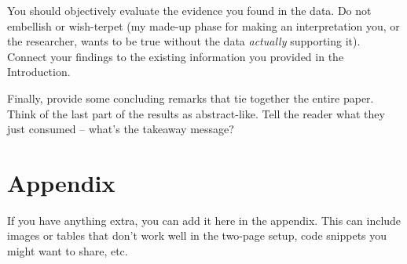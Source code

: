\documentclass{article}\usepackage[]{graphicx}\usepackage[]{xcolor}
\begin{document}
\begin{multicols}{2}
 You should objectively evaluate the evidence you found in the data. Do not embellish or wish-terpet (my made-up phase for making an interpretation you, or the researcher, wants to be true without the data \emph{actually} supporting it). Connect your findings to the existing information you provided in the Introduction.

Finally, provide some concluding remarks that tie together the entire paper. Think of the last part of the results as abstract-like. Tell the reader what they just consumed -- what's the takeaway message?

\vspace{2em}


\begin{tiny}

\end{tiny}
\end{multicols}

\newpage
\onecolumn
\section{Appendix}

If you have anything extra, you can add it here in the appendix. This can include images or tables that don't work well in the two-page setup, code snippets you might want to share, etc.
\end{document}
